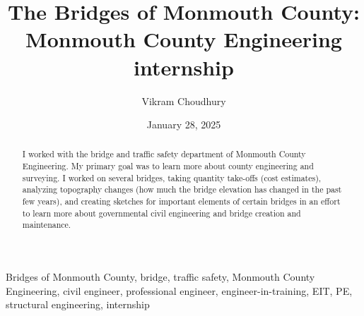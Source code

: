﻿\documentclass[12pt,conference,onecolumn]{IEEEtran}
\title{The Bridges of Monmouth County: Monmouth County Engineering internship}
\author{Vikram Choudhury}
\date{January 28, 2025}
\newcommand{\keywords}{Bridges of Monmouth County, bridge, traffic safety, Monmouth County Engineering, civil engineer, professional engineer, engineer-in-training, EIT, PE, structural engineering, internship}
\begin{document}
\maketitle 

\begin{abstract}
I worked with the bridge and traffic safety department of Monmouth County Engineering. My primary goal was to learn more about county engineering and surveying. I worked on several bridges, taking quantity take-offs (cost estimates), analyzing topography changes (how much the bridge elevation has changed in the past few years), and creating sketches for important elements of certain bridges in an effort to learn more about governmental civil engineering and bridge creation and maintenance.
\end{abstract}

\begin{IEEEkeywords}
\keywords
\end{IEEEkeywords}
\end{document}

